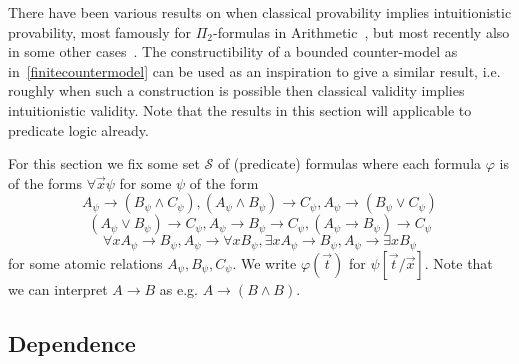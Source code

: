 \documentclass[a4paper,12pt]{report}
\theoremstyle{definition}
\theoremstyle{definition}
\theoremstyle{definition}
\theoremstyle{definition}
\theoremstyle{definition}
\theoremstyle{definition}
\theoremstyle{definition}
\begin{document}
	There have been various results on when classical provability implies intuitionistic provability, most famously for $\Pi_2$-formulas in Arithmetic~\cite{Friedman_1978}, but most recently also in some other cases~\cite{schwichtenberg, practical}. The constructibility of a bounded counter-model as in~\ref{finitecountermodel} can be used as an inspiration to give a similar result, i.e. roughly when such a construction is possible then classical validity implies intuitionistic validity. Note that the results in this section will applicable to predicate logic already.
	
	For this section we fix some set $\mathcal S$ of (predicate) formulas where each formula $\varphi$ is of the forms $\forall \vec x\psi$ for some $\psi$ of the form
	$$A_\psi\to(B_\psi\wedge C_\psi), (A_\psi\wedge B_\psi)\to C_\psi, A_\psi\to (B_\psi\vee C_\psi)$$$$(A_\psi\vee B_\psi)\to C_\psi, A_\psi\to B_\psi\to C_\psi, (A_\psi\to B_\psi)\to  C_\psi$$$$\forall xA_\psi\to B_\psi, A_\psi\to \forall xB_\psi, \exists xA_\psi\to B_\psi, A_\psi\to\exists xB_\psi$$
	for some atomic relations $A_\psi, B_\psi, C_\psi$. We write $\varphi(\vec t)$ for $\psi[\vec t/\vec x]$. Note that we can interpret $A\to B$ as e.g. $A\to (B\wedge B)$. 
	
	\subsection{Dependence}
	
\end{document}

